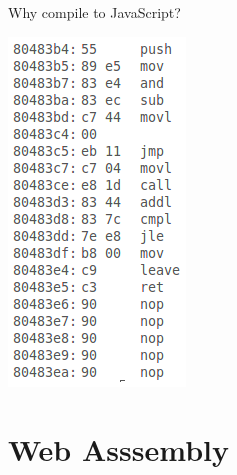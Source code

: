 \documentclass{lug}
\newcommand{\pmidg}[1]{\parbox{\widthof{#1}}{#1}}
\begin{document}
\begin{frame}{Why compile to JavaScript?}
{    }{\pmidg{
        \includegraphics[width=\columnwidth]{graphics/machine_code}
    }}
\end{frame}

\renewcommand{\secimage}{graphics/wasm_logo}
\section{Web Asssembly}
\end{document}
